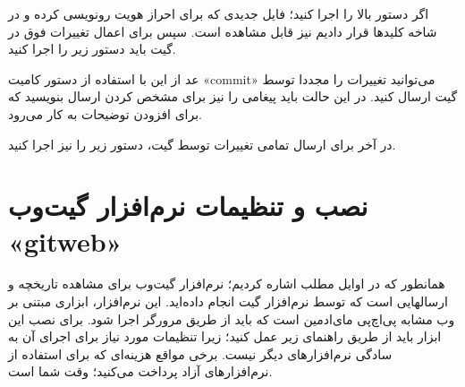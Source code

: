 \begin{latin}  
    
\end{latin}
اگر دستور بالا را اجرا کنید؛ فایل جدیدی که برای احراز هویت رونویسی کرده و در شاخه کلیدها قرار دادیم نیز قابل مشاهده است. سپس برای اعمال تغییرات فوق در گیت باید دستور زیر را اجرا کنید.
\newline

\begin{latin}  
    
\end{latin}
عد از این با استفاده از دستور کامیت «commit» می‌توانید تغییرات را مجددا توسط گیت ارسال کنید. در این حالت باید پیغامی را نیز برای مشخص کردن ارسال بنویسید که برای  افزودن توضیحات به کار می‌رود.
\newline

\begin{latin}  
    
\end{latin}

در آخر برای ارسال تمامی تغییرات توسط گیت، دستور زیر را نیز اجرا کنید.

\begin{latin}  
    
\end{latin}

\section{ نصب و تنظیمات نرم‌افزار گیت‌وب «gitweb»}
همانطور که در اوایل مطلب اشاره کردیم؛ نرم‌افزار گیت‌وب برای مشاهده تاریخچه و ارسالهایی است که توسط نرم‌افزار گیت انجام داده‌اید. این نرم‌افزار، ابزاری مبتنی بر وب مشابه پی‌اچ‌پی مای‌ادمین است که باید از طریق مرورگر اجرا شود. برای نصب این ابزار باید از طریق راهنمای زیر عمل کنید؛ زیرا تنظیمات مورد نیاز برای اجرای  آن به سادگی نرم‌افزارهای دیگر نیست. برخی مواقع هزینه‌ای که برای استفاده از نرم‌افزارهای  آزاد پرداخت می‌کنید؛ وقت شما است.
\newline

\begin{latin}  
    
\end{latin}

